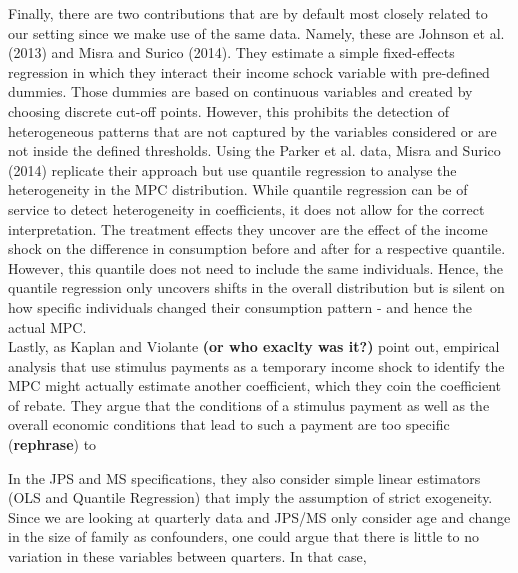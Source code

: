 Finally, there are two contributions that are by default most closely related to our setting since we make use of the same data. Namely, these are Johnson et al. (2013) and Misra and Surico (2014). 
They estimate a simple fixed-effects regression in which they interact their income schock variable with pre-defined dummies. Those dummies are based on continuous variables and created by choosing discrete cut-off points. However, this prohibits the detection of heterogeneous patterns that are not captured by the variables considered or are not inside the defined thresholds. Using the Parker et al. data, Misra and Surico (2014) replicate their approach but use quantile regression to analyse the heterogeneity in the MPC distribution. While quantile regression can be of service to detect heterogeneity in coefficients, it does not allow for the correct interpretation. The treatment effects they uncover are the effect of the income shock on the difference in consumption before and after for a respective quantile. However, this quantile does not need to include the same individuals. Hence, the quantile regression only uncovers shifts in the overall distribution but is silent on how specific individuals changed their consumption pattern - and hence the actual MPC. \\
Lastly, as Kaplan and Violante \textbf{(or who exaclty was it?)} point out, empirical analysis that use stimulus payments as a temporary income shock to identify the MPC might actually estimate another coefficient, which they coin the coefficient of rebate. They argue that the conditions of a stimulus payment as well as the overall economic conditions that lead to such a payment are too specific (\textbf{rephrase}) to 

In the JPS and MS specifications, they also consider simple linear estimators (OLS and Quantile Regression) that imply the assumption of strict exogeneity. Since we are looking at quarterly data and JPS/MS only consider age and change in the size of family as confounders, one could argue that there is little to no variation in these variables between quarters. In that case, 